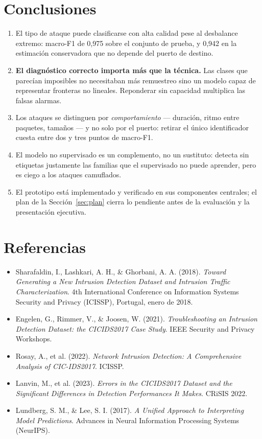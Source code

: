 \documentclass[11pt,a4paper]{article}
\begin{document}
\section{Conclusiones}

\begin{enumerate}
\item El tipo de ataque puede clasificarse con alta calidad pese al
desbalance extremo: macro-F1 de 0,975 sobre el conjunto de prueba, y 0,942 en
la estimación conservadora que no depende del puerto de destino.
\item \textbf{El diagnóstico correcto importa más que la técnica.} Las clases
que parecían imposibles no necesitaban más remuestreo sino un modelo capaz de
representar fronteras no lineales. Reponderar sin capacidad multiplica las
falsas alarmas.
\item Los ataques se distinguen por \emph{comportamiento} --- duración,
ritmo entre paquetes, tamaños --- y no solo por el puerto: retirar el único
identificador cuesta entre dos y tres puntos de macro-F1.
\item El modelo no supervisado es un complemento, no un sustituto: detecta
sin etiquetas justamente las familias que el supervisado no puede aprender,
pero es ciego a los ataques camuflados.
\item El prototipo está implementado y verificado en sus componentes
centrales; el plan de la Sección~\ref{sec:plan} cierra lo pendiente antes de la evaluación
y la presentación ejecutiva.
\end{enumerate}

\section*{Referencias}

\begin{itemize}[leftmargin=*, label={}]
\item Sharafaldin, I., Lashkari, A. H., \& Ghorbani, A. A. (2018).
\emph{Toward Generating a New Intrusion Detection Dataset and Intrusion
Traffic Characterization}. 4th International Conference on Information
Systems Security and Privacy (ICISSP), Portugal, enero de 2018.
\item Engelen, G., Rimmer, V., \& Joosen, W. (2021). \emph{Troubleshooting an
Intrusion Detection Dataset: the CICIDS2017 Case Study}. IEEE Security and
Privacy Workshops.
\item Rosay, A., et al. (2022). \emph{Network Intrusion Detection: A
Comprehensive Analysis of CIC-IDS2017}. ICISSP.
\item Lanvin, M., et al. (2023). \emph{Errors in the CICIDS2017 Dataset and
the Significant Differences in Detection Performances It Makes}. CRiSIS 2022.
\item Lundberg, S. M., \& Lee, S. I. (2017). \emph{A Unified Approach to
Interpreting Model Predictions}. Advances in Neural Information Processing
Systems (NeurIPS).
\end{itemize}
\end{document}

